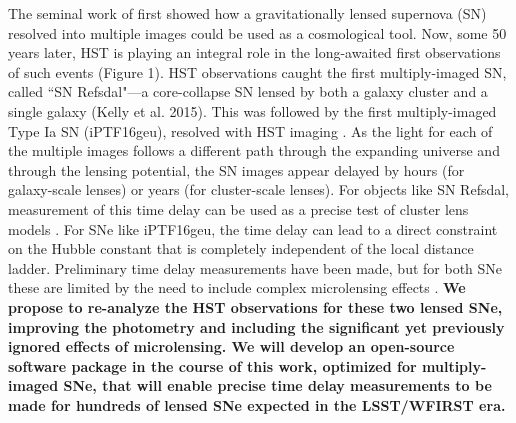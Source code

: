 \forceindent The seminal work of \citet{Refsdal:1964} first showed how a
gravitationally lensed supernova (SN) resolved into multiple images
could be used as a cosmological tool.  Now, some 50 years later, HST
is playing an integral role in the long-awaited first observations of
such events (Figure 1).  HST observations caught the first
multiply-imaged SN, called ``SN Refsdal"---a core-collapse SN lensed
by both a galaxy cluster and a single galaxy (Kelly et al. 2015). This
was followed by the first multiply-imaged Type Ia SN (iPTF16geu),
resolved with HST imaging \citep{Goobar:2016}.  As the light for each
of the multiple images follows a different path through the expanding
universe and through the lensing potential, the SN images appear
delayed by hours (for galaxy-scale lenses) or years (for cluster-scale
lenses). For objects like SN Refsdal, measurement of this time delay can be used as
a precise test of cluster lens models
\citep{Treu:2015b}. For SNe like iPTF16geu, the time delay can lead to a direct
constraint on the Hubble constant that is completely independent of
the local distance ladder. Preliminary time delay measurements have
been made, but for both SNe these are limited by the need to include
complex microlensing effects \citep{Rodney:2016,More:2016}.  {\bf We
propose to re-analyze the HST observations for these two lensed SNe,
improving the photometry and including the significant yet previously
ignored effects of microlensing.  We will develop an open-source
software package in the course of this work, optimized for
multiply-imaged SNe, that will enable precise time delay measurements
to be made for hundreds of lensed SNe expected in the LSST/WFIRST
era.}

